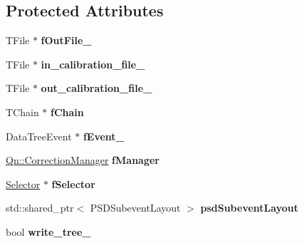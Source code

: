\subsection*{Protected Attributes}
\begin{DoxyCompactItemize}
\item 
\mbox{\label{classQn_1_1CorrectionTask_ac72fc635f65891cf91f289160ba07bbf}} 
T\+File $\ast$ {\bfseries f\+Out\+File\+\_\+}
\item 
\mbox{\label{classQn_1_1CorrectionTask_a23dc5f3e78ec7873b14467780bbea6fd}} 
T\+File $\ast$ {\bfseries in\+\_\+calibration\+\_\+file\+\_\+}
\item 
\mbox{\label{classQn_1_1CorrectionTask_ae9ff401275aaf0790d085a2be5977b90}} 
T\+File $\ast$ {\bfseries out\+\_\+calibration\+\_\+file\+\_\+}
\item 
\mbox{\label{classQn_1_1CorrectionTask_aa72d55988bbfe57ae56d2ee62f983f47}} 
T\+Chain $\ast$ {\bfseries f\+Chain}
\item 
\mbox{\label{classQn_1_1CorrectionTask_abf3ec1133e5f090b513722f593b680cf}} 
Data\+Tree\+Event $\ast$ {\bfseries f\+Event\+\_\+}
\item 
\mbox{\label{classQn_1_1CorrectionTask_af69ae1296f252e14a569b1cb4c34d368}} 
\mbox{\hyperlink{classQn_1_1CorrectionManager}{Qn\+::\+Correction\+Manager}} {\bfseries f\+Manager}
\item 
\mbox{\label{classQn_1_1CorrectionTask_a3a098fd8903cedb5ed144cc3949f036e}} 
\mbox{\hyperlink{classSelector}{Selector}} $\ast$ {\bfseries f\+Selector}
\item 
\mbox{\label{classQn_1_1CorrectionTask_a3aa6434b8cd436c8bc32eefcd34dab85}} 
std\+::shared\+\_\+ptr$<$ P\+S\+D\+Subevent\+Layout $>$ {\bfseries psd\+Subevent\+Layout}
\item 
\mbox{\label{classQn_1_1CorrectionTask_a9d9cfcf4e70bf932ba622f88bf95d34d}} 
bool {\bfseries write\+\_\+tree\+\_\+}
\end{DoxyCompactItemize}


